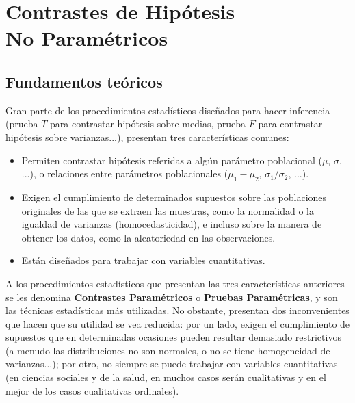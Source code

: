 
\chapter[Contras de Hipótesis No Paramétricos]{Contrastes de Hipótesis\\ No Paramétricos}


\section{Fundamentos teóricos}

Gran parte de los procedimientos estadísticos diseñados para hacer inferencia (prueba $T$ para contrastar hipótesis sobre medias, prueba $F$ para contrastar hipótesis sobre varianzas...), presentan tres características comunes:

\begin{itemize}
\item Permiten contrastar hipótesis referidas a algún parámetro poblacional ($\mu$, $\sigma$, ...), o relaciones entre parámetros poblacionales ($\mu_1-\mu_2$, $\sigma_1/\sigma_2$, ...).
\item Exigen el cumplimiento de determinados supuestos sobre las poblaciones originales de las que se extraen las muestras, como la normalidad o la igualdad de varianzas (homocedasticidad), e incluso sobre la manera de obtener los datos, como la aleatoriedad en las observaciones.
\item Están diseñados para trabajar con variables cuantitativas.
\end{itemize}

A los procedimientos estadísticos que presentan las tres características anteriores se les denomina \textbf{Contrastes Paramétricos} o \textbf{Pruebas Paramétricas}, y son las técnicas estadísticas más utilizadas. No obstante, presentan dos inconvenientes que hacen que su utilidad se vea reducida: por un lado, exigen el cumplimiento de supuestos que en determinadas ocasiones pueden resultar demasiado restrictivos (a menudo las distribuciones no son normales, o no se tiene homogeneidad de varianzas...); por otro, no siempre se puede trabajar con variables cuantitativas (en ciencias sociales y de la salud, en muchos casos serán cualitativas y en el mejor de los casos cualitativas ordinales).

